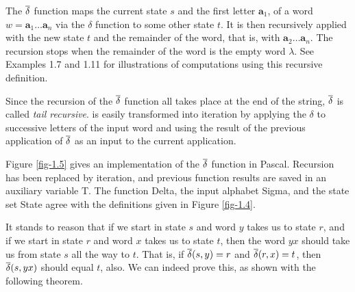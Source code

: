 The $\overline{\delta}$ function maps the current state $s$ and the first letter
$\pmb{a}_1$, of a word $w=\pmb{a}_1\ldots\pmb{a}_n$ via the $\delta$ function to
some other state $t$. It is then recursively applied with the new state $t$ and
the remainder of the word, that is, with $\pmb{a}_2\ldots\pmb{a}_n$. The
recursion stops when the remainder of the word is the empty word $\lambda$. See
Examples 1.7 and 1.11 for illustrations of computations using
this recursive definition.

Since the recursion of the $\overline{\delta}$ function all takes place at the
end of the string, $\overline{\delta}$ is called \emph{tail recursive}. 
is easily transformed into iteration by applying the $\delta$ to successive
letters of the input word and using the result of the previous application of
$\overline{\delta}$ as an input to the current application.

Figure \ref{fig-1.5} gives an implementation of the $\overline{\delta}$ function in
Pascal. Recursion has been replaced by iteration, and previous function results
are saved in an auxiliary variable T. The function Delta, the input alphabet
Sigma, and the state set State agree with the definitions given in Figure
\ref{fig-1.4}.

It stands to reason that if we start in state $s$ and word $y$ takes us to state
$r$, and if we start in state $r$ and word $x$ takes us to state $t$, then the
word $yx$ should take us from state $s$ all the way to $t$. That is, if
$\overline{\delta}(s,y) = r$ and $\overline{\delta}(r,x) = t$, then
$\overline{\delta}(s,yx)$ should equal $t$, also. We can indeed prove this, as
shown with the following theorem.

